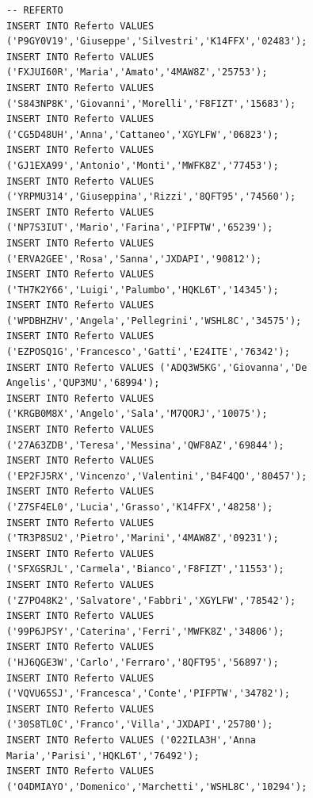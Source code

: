 \documentclass[12pt]{report}
\begin{document}
\begin{scriptsize}
\begin{verbatim}
-- REFERTO
INSERT INTO Referto VALUES ('P9GY0V19','Giuseppe','Silvestri','K14FFX','02483');
INSERT INTO Referto VALUES ('FXJUI60R','Maria','Amato','4MAW8Z','25753');
INSERT INTO Referto VALUES ('S843NP8K','Giovanni','Morelli','F8FIZT','15683');
INSERT INTO Referto VALUES ('CG5D48UH','Anna','Cattaneo','XGYLFW','06823');
INSERT INTO Referto VALUES ('GJ1EXA99','Antonio','Monti','MWFK8Z','77453');
INSERT INTO Referto VALUES ('YRPMU314','Giuseppina','Rizzi','8QFT95','74560');
INSERT INTO Referto VALUES ('NP7S3IUT','Mario','Farina','PIFPTW','65239');
INSERT INTO Referto VALUES  ('ERVA2GEE','Rosa','Sanna','JXDAPI','90812');
INSERT INTO Referto VALUES ('TH7K2Y66','Luigi','Palumbo','HQKL6T','14345');
INSERT INTO Referto VALUES ('WPDBHZHV','Angela','Pellegrini','WSHL8C','34575');
INSERT INTO Referto VALUES ('EZPOSQ1G','Francesco','Gatti','E24ITE','76342');
INSERT INTO Referto VALUES ('ADQ3W5KG','Giovanna','De Angelis','QUP3MU','68994');
INSERT INTO Referto VALUES ('KRGB0M8X','Angelo','Sala','M7QORJ','10075');
INSERT INTO Referto VALUES ('27A63ZDB','Teresa','Messina','QWF8AZ','69844');
INSERT INTO Referto VALUES  ('EP2FJ5RX','Vincenzo','Valentini','B4F4QO','80457');
INSERT INTO Referto VALUES ('Z7SF4EL0','Lucia','Grasso','K14FFX','48258');
INSERT INTO Referto VALUES ('TR3P8SU2','Pietro','Marini','4MAW8Z','09231');
INSERT INTO Referto VALUES ('SFXGSRJL','Carmela','Bianco','F8FIZT','11553');
INSERT INTO Referto VALUES ('Z7PO48K2','Salvatore','Fabbri','XGYLFW','78542');
INSERT INTO Referto VALUES ('99P6JPSY','Caterina','Ferri','MWFK8Z','34806');
INSERT INTO Referto VALUES ('HJ6QGE3W','Carlo','Ferraro','8QFT95','56897');
INSERT INTO Referto VALUES ('VQVU65SJ','Francesca','Conte','PIFPTW','34782');
INSERT INTO Referto VALUES ('30S8TL0C','Franco','Villa','JXDAPI','25780');
INSERT INTO Referto VALUES ('022ILA3H','Anna Maria','Parisi','HQKL6T','76492');
INSERT INTO Referto VALUES ('O4DMIAYO','Domenico','Marchetti','WSHL8C','10294');


\end{verbatim}
\end{scriptsize}
\end{document}
